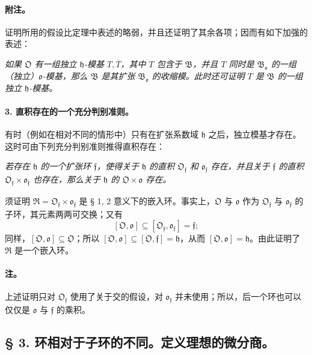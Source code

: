 \documentclass[11pt]{article}
\begin{document}
\paragraph{附注。}
证明所用的假设比定理中表述的略弱，并且还证明了其余各项；因而有如下加强的表述：

\emph{如果 \(\mathfrak O\) 有一组独立 \(\mathfrak h\)-模基 \(T,\overline T\)，其中 \(T\) 包含于 \(\mathfrak B\)，并且 \(T\) 同时是 \(\mathfrak B_{\mathfrak o}\) 的一组（独立）\(\mathfrak o\)-模基，那么 \(\mathfrak B\) 是其扩张 \(\mathfrak B_{\mathfrak o}\) 的收缩模。此时还可证明 \(T\) 是 \(\mathfrak B\) 的一组独立 \(\mathfrak h\)-模基。}

\paragraph{3. 直积存在的一个充分判别准则。}
有时（例如在相对不同的情形中）只有在扩张系数域 \(\mathfrak h\) 之后，独立模基才存在。这时可由下列充分判别准则推得直积存在：

\emph{若存在 \(\mathfrak h\) 的一个扩张环 \(\mathfrak f\)，使得关于 \(\mathfrak h\) 的直积 \(\mathfrak O_{\mathfrak f}\) 和 \(\mathfrak o_{\mathfrak f}\) 存在，并且关于 \(\mathfrak f\) 的直积 \(\mathfrak O_{\mathfrak f}\times\mathfrak o_{\mathfrak f}\) 也存在，那么关于 \(\mathfrak h\) 的 \(\mathfrak O\times\mathfrak o\) 存在。}

须证明 \(\mathfrak R=\mathfrak O_{\mathfrak f}\times\mathfrak o_{\mathfrak f}\) 是 § 1, 2 意义下的嵌入环。事实上，\(\mathfrak O\) 与 \(\mathfrak o\) 作为 \(\mathfrak O_{\mathfrak f}\) 与 \(\mathfrak o_{\mathfrak f}\) 的子环，其元素两两可交换；又有
\[
[\mathfrak O,\mathfrak o]\subseteq[\mathfrak O_{\mathfrak f},\mathfrak o_{\mathfrak f}]=\mathfrak f;
\]
同样，\([\mathfrak O,\mathfrak o]\subseteq\mathfrak O\)；所以 \([\mathfrak O,\mathfrak o]\subseteq[\mathfrak O,\mathfrak f]=\mathfrak h\)，从而 \([\mathfrak O,\mathfrak o]=\mathfrak h\)。由此证明了 \(\mathfrak R\) 是一个嵌入环。

\paragraph{注。}
上述证明只对 \(\mathfrak O_{\mathfrak f}\) 使用了关于交的假设，对 \(\mathfrak o_{\mathfrak f}\) 并未使用；所以，后一个环也可以仅仅是 \(\mathfrak o\) 与 \(\mathfrak f\) 的乘积。
\subsection*{§ 3. 环相对于子环的不同。定义理想的微分商。}
\end{document}
